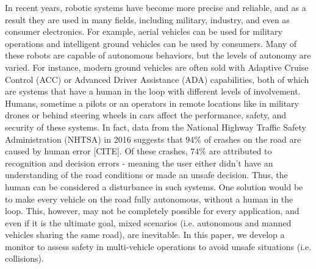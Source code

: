 \documentclass[letterpaper, 10 pt, conference]{ieeeconf}  %
\newcommand\NB[1]{$\spadesuit$\footnote{NB: #1}}
\begin{document}

In recent years, robotic systems have become more precise and reliable, and as a result they are used in many fields, including military, industry, and even as consumer electronics. For example, aerial vehicles can be used for military operations and intelligent ground vehicles can be used by consumers. Many of these robots are capable of autonomous behaviors, but the levels of autonomy are varied. For instance, modern ground vehicles are often sold with Adaptive Cruise Control (ACC)\cite{acc} or Advanced Driver Assistance (ADA)\cite{adas} capabilities, both of which are systems that have a human in the loop with different levels of involvement. Humans, sometime a pilots or an operators in remote locations like in military drones or behind steering wheels in cars affect the performance, safety, and security of these systems. In fact, data from the National Highway Traffic Safety Administration (NHTSA) in 2016 suggests that $94\%$ of crashes on the road are caused by human error [CITE]. Of these crashes, $74\%$ are attributed to recognition and decision errors - meaning the user either didn't have an understanding of the road conditions or made an unsafe decision. Thus, the human can be considered a disturbance in such systems. One solution would be to make every vehicle on the road fully autonomous, without a human in the loop. This, however, may not be completely possible for every application, and even if it is the ultimate goal, mixed scenarios (i.e. autonomous and manned vehicles sharing the same road), are inevitable. In this paper, we develop a monitor to assess safety in multi-vehicle operations to avoid unsafe situations (i.e. collisions).
\end{document}
